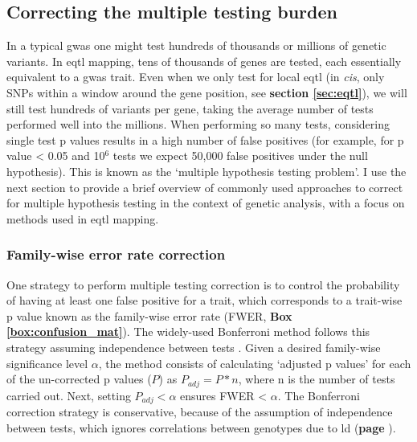 \subsection{Correcting the multiple testing burden}
\label{sec:multiple_testing}

In a typical \gls{gwas} one might test hundreds of thousands or millions of genetic variants. 
In e\gls{qtl} mapping, tens of thousands of genes are tested, each essentially equivalent to a \gls{gwas} trait. 
Even when we only test for local e\gls{qtl} (in \textit{cis}, only SNPs within a window around the gene position, see \textbf{section \ref{sec:eqtl}}), we will still test hundreds of variants per gene, taking the average number of tests performed well into the millions.
When performing so many tests, considering single test p values results in a high number of false positives (for example, for p value < 0.05 and 10$^6$ tests we expect 50,000 false positives under the null hypothesis). 
This is known as the `multiple hypothesis testing problem'. 
I use the next section to provide a brief overview of commonly used approaches to correct for multiple hypothesis testing in the context of genetic analysis, with a focus on methods used in e\gls{qtl} mapping.

\subsubsection{Family-wise error rate correction} 

One strategy to perform multiple testing correction is to control the probability of having at least one false positive for a trait, which corresponds to a trait-wise p value known as the family-wise error rate (FWER, \textbf{Box \ref{box:confusion_mat}}).
The widely-used Bonferroni method follows this strategy assuming independence between tests \cite{laird2010fundamentals}. 
Given a desired family-wise significance level $\alpha$, the method consists of calculating `adjusted p values' for each of the un-corrected p values ($P$) as $P_{adj} = P*n $, where n is the number of tests carried out.
Next, setting $P_{adj} < \alpha$ ensures FWER < $\alpha$. 
The Bonferroni correction strategy is conservative, because of the assumption of independence between tests, which ignores correlations between genotypes due to \gls{ld} (\textbf{page \pageref{sec:ld}}).\\

